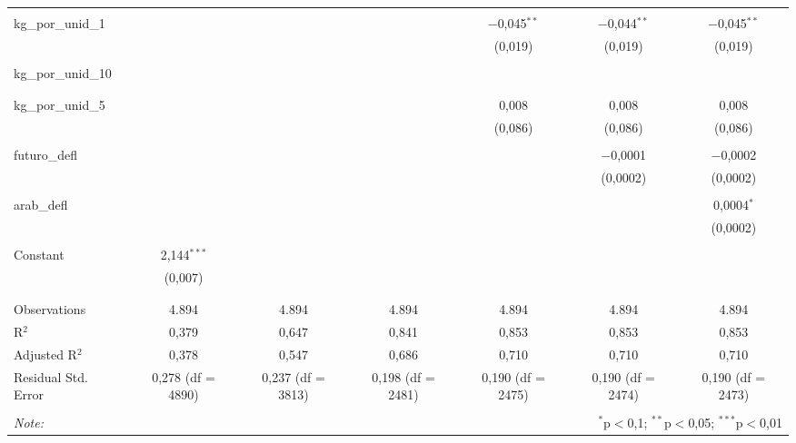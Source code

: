 \begin{table}[!htbp]
\begin{tabular}{@{\extracolsep{5pt}}lcccccc}
  & & & & & & \\ 
 kg\_por\_unid\_1 &  &  &  & $-$0,045$^{**}$ & $-$0,044$^{**}$ & $-$0,045$^{**}$ \\ 
  &  &  &  & (0,019) & (0,019) & (0,019) \\ 
  & & & & & & \\ 
 kg\_por\_unid\_10 &  &  &  &  &  &  \\ 
  &  &  &  &  &  &  \\ 
  & & & & & & \\ 
 kg\_por\_unid\_5 &  &  &  & 0,008 & 0,008 & 0,008 \\ 
  &  &  &  & (0,086) & (0,086) & (0,086) \\ 
  & & & & & & \\ 
 futuro\_defl &  &  &  &  & $-$0,0001 & $-$0,0002 \\ 
  &  &  &  &  & (0,0002) & (0,0002) \\ 
  & & & & & & \\ 
 arab\_defl &  &  &  &  &  & 0,0004$^{*}$ \\ 
  &  &  &  &  &  & (0,0002) \\ 
  & & & & & & \\ 
 Constant & 2,144$^{***}$ &  &  &  &  &  \\ 
  & (0,007) &  &  &  &  &  \\ 
  & & & & & & \\ 
\hline \\[-1.8ex] 
Observations & 4.894 & 4.894 & 4.894 & 4.894 & 4.894 & 4.894 \\ 
R$^{2}$ & 0,379 & 0,647 & 0,841 & 0,853 & 0,853 & 0,853 \\ 
Adjusted R$^{2}$ & 0,378 & 0,547 & 0,686 & 0,710 & 0,710 & 0,710 \\ 
Residual Std. Error & 0,278 (df = 4890) & 0,237 (df = 3813) & 0,198 (df = 2481) & 0,190 (df = 2475) & 0,190 (df = 2474) & 0,190 (df = 2473) \\ 
\hline 
\hline \\[-1.8ex] 
\textit{Note:}  & \multicolumn{6}{r}{$^{*}$p$<$0,1; $^{**}$p$<$0,05; $^{***}$p$<$0,01} \\ 
\end{tabular} 
\end{table} 
